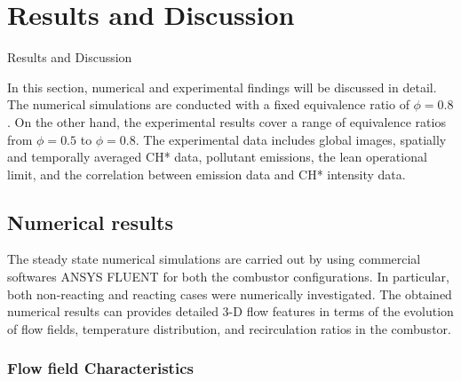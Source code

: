 \chapter[Results and Discussion]{Results and Discussion}{Results and Discussion}\label{CH5:R&D}

In this section, numerical and experimental findings will be discussed in detail. The numerical simulations are conducted with a fixed equivalence ratio of $\phi = 0.8$. On the other hand, the experimental results cover a range of equivalence ratios from $\phi = 0.5$ to $\phi = 0.8$. The experimental data includes global images, spatially and temporally averaged CH* data, pollutant emissions, the lean operational limit, and the correlation between emission data and CH* intensity data.

\section{\textbf{Numerical results}}
The steady state numerical simulations are carried out by  using commercial softwares ANSYS FLUENT for both the combustor configurations. In particular, both non-reacting and reacting cases were numerically investigated. The obtained numerical results can provides detailed 3-D flow features in terms of the evolution of flow fields, temperature distribution, and recirculation ratios in the combustor. 

\subsection{Flow field Characteristics}


